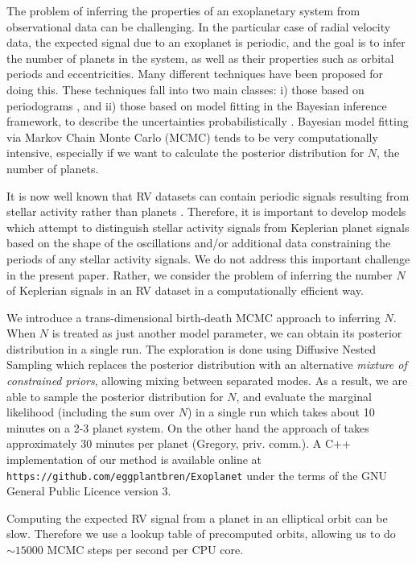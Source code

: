 \documentclass[useAMS,usenatbib]{mn2e}
\begin{document}
The problem of inferring the properties of an
exoplanetary system from observational data can be challenging.
In the particular case of radial velocity data,
the expected signal due to an exoplanet is periodic, and the goal is to
infer the number of planets in the system, as well as their properties such
as orbital periods and eccentricities. Many
different techniques have been proposed for doing this.
These techniques fall into two main
classes: i) those based on periodograms \citep[e.g.][]{2009A&A...496..577Z},
and ii) those based on model fitting in the Bayesian inference framework,
to describe the uncertainties probabilistically
\citep[e.g.][]{2011MNRAS.410...94G, 2014MNRAS.437.3540F,
2011A&A...528L...5T, fengji}. Bayesian model fitting via Markov Chain Monte
Carlo (MCMC) tends to be very computationally intensive, especially if we
want to calculate the posterior distribution for $N$, the number of planets.

It is now well known that RV datasets can contain periodic signals
resulting from stellar activity rather than planets \citep{2014Sci...345..440R}.
Therefore, it is important to develop models which attempt to distinguish
stellar activity signals from Keplerian planet signals based on the shape of
the oscillations and/or additional data constraining the periods of any
stellar activity signals. We do not address this important challenge in the
present paper. Rather, we consider the problem of inferring the number $N$ of
Keplerian signals in an RV dataset in a computationally efficient way.

We introduce a trans-dimensional birth-death MCMC approach
\citep{birthdeath} to inferring $N$.
When $N$ is treated as just another model parameter, we can obtain its
posterior distribution in a single run.
The exploration is done using Diffusive Nested Sampling
\citep[DNS][]{dnest} which replaces the posterior distribution with an alternative
{\it mixture of constrained priors}, allowing mixing between separated modes.
As a result, we are able to sample the posterior distribution for $N$, and
evaluate the marginal likelihood (including the sum over $N$) in
a single run which takes about 10 minutes on a 2-3 planet system.
On the other hand the approach of
\citet{2011MNRAS.410...94G} takes approximately 30 minutes per planet
(Gregory, priv. comm.). A C++ implementation of our method is available online
at {\tt https://github.com/eggplantbren/Exoplanet} under the terms of the
GNU General Public Licence version 3.

Computing the expected RV signal from
a planet in an elliptical orbit can be slow. Therefore we use a lookup table
of precomputed orbits, allowing us to do $\sim 15000$ MCMC steps per second
per CPU core.
\end{document}
